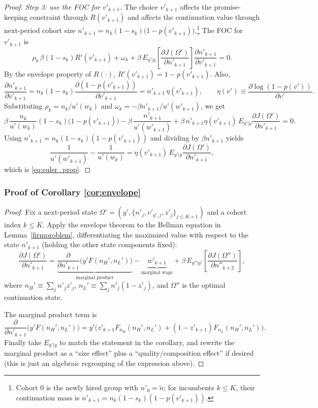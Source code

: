 \begin{proof}
\medskip
\noindent\textit{Step 3: use the FOC for $v'_{k+1}$.}
The choice $v'_{k+1}$ affects the promise-keeping constraint through $R(v'_{k+1})$ and affects the continuation value
through next-period cohort size $n'_{k+1}=n_k(1-s_k)\big(1-p(v'_{k+1})\big)$.\footnote{Cohort $0$ is the newly hired group with
$n'_0=\tilde n$; for incumbents $k\le K$, their continuation mass is $n'_{k+1}=n_k(1-s_k)(1-p(v'_{k+1}))$.}
The FOC for $v'_{k+1}$ is
\[
\rho_k\,\beta(1-s_k)R'(v'_{k+1})
+\omega_k
+\beta\,E_{y'|y}\!\left[\frac{\partial J(\Omega')}{\partial n'_{k+1}}\right]\frac{\partial n'_{k+1}}{\partial v'_{k+1}}
=0.
\]
By the envelope property of $R(\cdot)$,
$R'(v'_{k+1})=1-p(v'_{k+1})$.
Also,
\[
\frac{\partial n'_{k+1}}{\partial v'_{k+1}}
=
n_k(1-s_k)\frac{\partial (1-p(v'_{k+1}))}{\partial v'_{k+1}}
=
n'_{k+1}\,\eta(v'_{k+1}),
\qquad
\eta(v')\equiv \frac{\partial\log(1-p(v'))}{\partial v'}.
\]
Substituting $\rho_k=n_k/u'(w_k)$ and $\omega_k=-\beta n'_{k+1}/u'(w'_{k+1})$, we get
\[
\beta\,\frac{n_k}{u'(w_k)}(1-s_k)\big(1-p(v'_{k+1})\big)
-\beta\,\frac{n'_{k+1}}{u'(w'_{k+1})}
+\beta\,n'_{k+1}\eta(v'_{k+1})\,E_{y'|y}\frac{\partial J(\Omega')}{\partial n'_{k+1}}
=0.
\]
Using $n'_{k+1}=n_k(1-s_k)(1-p(v'_{k+1}))$ and dividing by $\beta n'_{k+1}$ yields
\[
\frac{1}{u'(w'_{k+1})}-\frac{1}{u'(w_k)}
=
\eta(v'_{k+1})\,E_{y'|y}\frac{\partial J(\Omega')}{\partial n'_{k+1}},
\]
which is \eqref{eq:euler_prop}.
\end{proof}


\subsubsection*{Proof of Corollary \ref{cor:envelope}}\label{proof:envelope}
\begin{proof}
Fix a next-period state $\Omega'=(y',\{n'_j,v'_{y',j},z'_j\}_{j\le K+1})$ and a cohort index $k\le K$.
Apply the envelope theorem to the Bellman equation in Lemma~\ref{firmproblem}, differentiating the maximized value
with respect to the state $n'_{k+1}$ (holding the other state components fixed):
\[
\frac{\partial J(\Omega')}{\partial n'_{k+1}}
=
\underbrace{\frac{\partial}{\partial n'_{k+1}}\Big( y'F(n_H',n_L')\Big)}_{\text{marginal product}}
-\underbrace{w'_{k+1}}_{\text{marginal wage}}
+\beta\,E_{y''|y'}\left[\frac{\partial J(\Omega'')}{\partial n''_{k+2}}\right],
\]
where $n_H'\equiv\sum_j n'_j z'_j$, $n_L'\equiv\sum_j n'_j(1-z'_j)$, and $\Omega''$ is the optimal continuation state.

The marginal product term is
\[
\frac{\partial}{\partial n'_{k+1}}\Big(y'F(n_H',n_L')\Big)
=
y'\Big(z'_{k+1}F_{n_H}(n_H',n_L')+(1-z'_{k+1})F_{n_L}(n_H',n_L')\Big).
\]
Finally take $E_{y'|y}$ to match the statement in the corollary, and rewrite the marginal product as a ``size effect''
plus a ``quality/composition effect'' if desired (this is just an algebraic regrouping of the expression above).
\end{proof}


